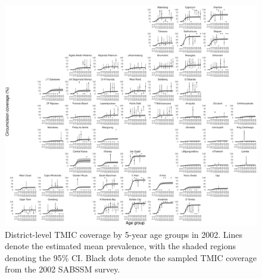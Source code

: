 \documentclass{article}
\begin{document}
\begin{appendix}

\begin{figure}[H]
	\centering
	\includegraphics[width = \linewidth]{Figures/suppmat/ModelFit/TMICPrev_5year_District_2002_withsurveypoints}
	\caption{District-level TMIC coverage by 5-year age groups in 2002. Lines denote the estimated mean prevalence, with the shaded regions denoting the 95\% CI. Black dots denote the sampled TMIC coverage from the 2002 SABSSM survey.}
\end{figure}



\end{appendix}
\end{document}
